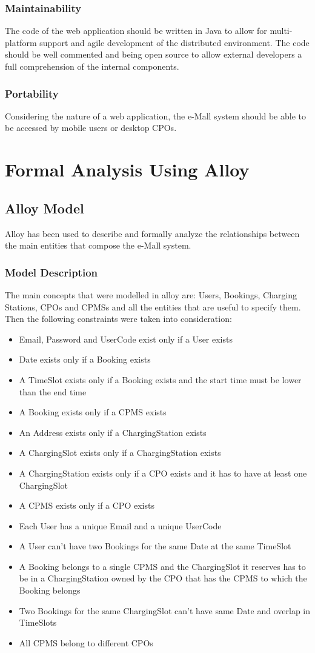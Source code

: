 \documentclass[12pt]{report}
\begin{document}
\subsection{Maintainability}
The code of the web application should be written in Java to allow for multi-platform support and agile development of the distributed environment. The code should be well commented and being open source to allow external developers a full comprehension of the internal components.
\subsection{Portability}
Considering the nature of a web application, the e-Mall system should be able to be accessed by mobile users or desktop CPOs.

\chapter{Formal Analysis Using Alloy}
\section{Alloy Model}
Alloy has been used to describe and formally analyze the relationships between the main entities that compose the e-Mall system.
\subsection{Model Description}
The main concepts that were modelled in alloy are: Users, Bookings, Charging Stations, CPOs and CPMSs and all the entities that are useful to specify them.
Then the following constraints were taken into consideration:
\begin{itemize}
    \item Email, Password and UserCode exist only if a User exists
    \item Date exists only if a Booking exists
    \item A TimeSlot exists only if a Booking exists and the start time must be lower than the end time
    \item A Booking exists only if a CPMS exists
    \item An Address exists only if a ChargingStation exists
    \item A ChargingSlot exists only if a ChargingStation exists
    \item A ChargingStation exists only if a CPO exists and it has to have at least one ChargingSlot
    \item A CPMS exists only if a CPO exists
    \item Each User has a unique Email and a unique UserCode
    \item A User can't have two Bookings for the same Date at the same TimeSlot
    \item A Booking belongs to a single CPMS and the ChargingSlot it reserves has to be in a ChargingStation owned by the CPO that has the CPMS to which the Booking belongs
    \item Two Bookings for the same ChargingSlot can't have same Date and overlap in TimeSlots
    \item All CPMS belong to different CPOs
\end{itemize}
\end{document}
